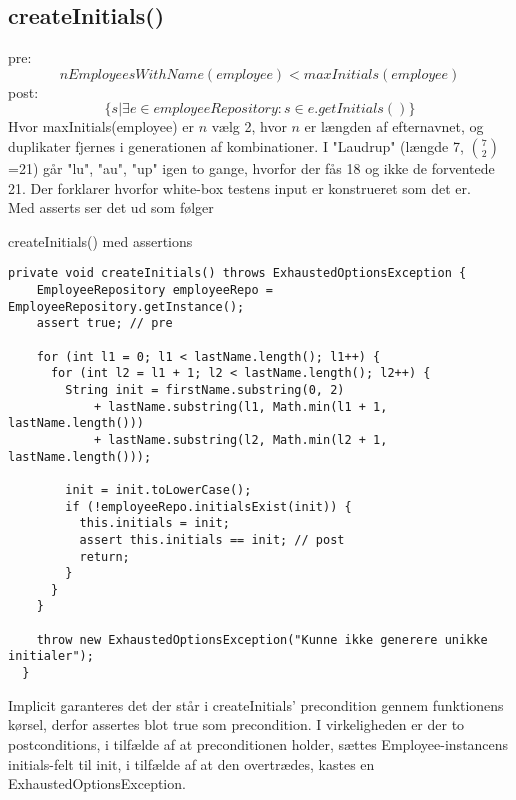 \subsection{createInitials()} \label{sec:contract_create_initials}
pre:
\begin{equation}
    nEmployeesWithName(employee) < maxInitials(employee)
\end{equation}
post:
\begin{equation}
    \{s | \exists e \in employeeRepository : s \in e.getInitials()\}
\end{equation}
Hvor maxInitials(employee) er $n$ vælg 2, hvor $n$ er længden af efternavnet, og duplikater fjernes i generationen af kombinationer.
I "Laudrup" (længde 7, $7 \choose 2$=21) går "lu", "au", "up" igen to gange, hvorfor der fås 18 og ikke de forventede 21. Der forklarer hvorfor white-box testens input er konstrueret som det er.\\[4mm]
Med asserts ser det ud som følger

\begin{listing}[H]
    \centering
    \caption{createInitials() med assertions}\label{lst:create_initials_assertions}
    \begin{verbatim}
private void createInitials() throws ExhaustedOptionsException {
    EmployeeRepository employeeRepo = EmployeeRepository.getInstance();
    assert true; // pre

    for (int l1 = 0; l1 < lastName.length(); l1++) {
      for (int l2 = l1 + 1; l2 < lastName.length(); l2++) {
        String init = firstName.substring(0, 2)
            + lastName.substring(l1, Math.min(l1 + 1, lastName.length()))
            + lastName.substring(l2, Math.min(l2 + 1, lastName.length()));

        init = init.toLowerCase();
        if (!employeeRepo.initialsExist(init)) {
          this.initials = init;
          assert this.initials == init; // post
          return;
        }
      }
    }

    throw new ExhaustedOptionsException("Kunne ikke generere unikke initialer");
  }
    \end{verbatim}
\end{listing}
\noindent
Implicit garanteres det der står i createInitials' precondition gennem funktionens kørsel, derfor assertes blot true som precondition. I virkeligheden er der to postconditions, i tilfælde af at preconditionen holder, sættes Employee-instancens initials-felt til init, i tilfælde af at den overtrædes, kastes en ExhaustedOptionsException.\\[4mm]

